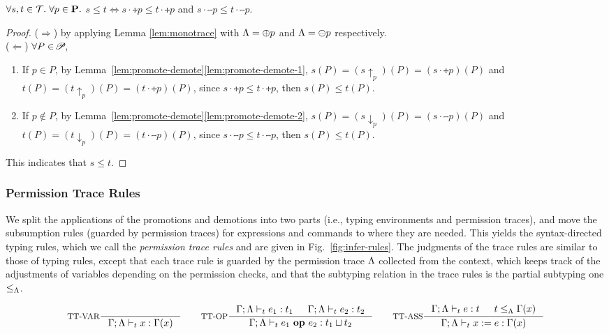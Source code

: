 {{{\begin{lemma}\label{lem:tracesub}
$\forall s,t\in\mathcal{T}.\; \forall p\in\mathbf{P}.$ $s\leq t\Leftrightarrow  s\cdot\tplus{ p}\leq t\cdot\tplus{ p}$ and $s\cdot\tminus{ p}\leq t\cdot\tminus{ p}$.
\end{lemma}
\begin{proof}
($\Rightarrow$) by applying Lemma \ref{lem:monotrace} with $\Lambda=\oplus  p$ and $\Lambda=\ominus p$ respectively.\\
($\Leftarrow$) $\forall P\in\!\mathscr{P}\!$,
\begin{enumerate}[label=(\arabic*)]
	\item If $p\in P$, by Lemma~\ref{lem:promote-demote}\ref{lem:promote-demote-1}, $s(P)=(s\uparrow_{p})(P)=(s\cdot\tplus{ p})(P)$ and $t(P)=(t\uparrow_{p})(P)=(t\cdot\tplus{ p})(P)$, since $s\cdot\tplus{ p}\leq t\cdot\tplus{ p}$, then $s(P)\leq t(P)$.
	\item If $p\not\in P$, by Lemma~\ref{lem:promote-demote}\ref{lem:promote-demote-2}, $s(P)=(s\downarrow_{p})(P)=(s\cdot\tminus{ p})(P)$ and $t(P)=(t\downarrow_{p})(P)=(t\cdot\tminus{ p})(P)$, since $s\cdot\tminus{ p}\leq t\cdot\tminus{p}$, then $s(P)\leq t(P)$.
\end{enumerate}
This indicates that $s\leq t$.
\end{proof}
\fi


\subsubsection{\textbf{Permission Trace Rules}}
 We split the applications of the promotions and demotions into two parts  (i.e., typing environments and permission traces), and move the subsumption rules (guarded by permission traces) for expressions and commands to where they are needed.
This yields the syntax-directed  typing rules, which we call the {\em permission trace rules} and are given in Fig.~\ref{fig:infer-rules}.
The judgments of the trace rules are similar to those of typing rules, except that each trace rule is guarded by the permission trace $\Lambda$ collected from the context, which keeps track of the adjustments of variables depending on the permission checks,
and that the subtyping relation in the trace rules is the partial subtyping one $\leq_{\Lambda}$.

\begin{figure*}[t]
\begin{tiny}
\[
\inference[TT-VAR]{}
{\Gamma;\trace\vdash_{t} \leVAR{x} : \Gamma(x)}
\qquad
\inference[TT-OP]
{\Gamma;\trace\vdash_{t} e_1: t_1 & \Gamma;\trace \vdash_{t} e_2: t_2}
{\Gamma;\trace \vdash_{t} \leOP{e_1}{e_2} : t_1\sqcup t_2}
\qquad
\inference[TT-ASS]
{\Gamma;\trace \vdash_{t} e : t & t \leq_{\trace} \Gamma(x)}
{\Gamma;\trace \vdash_{t} \lcASS{x}{e} : \Gamma(x)}
\]



\end{tiny}
\end{figure*}}}}

